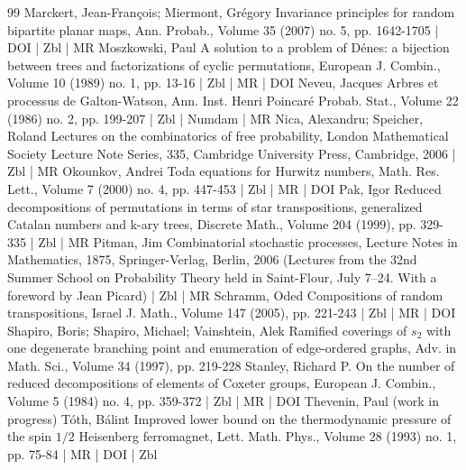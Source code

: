 \documentclass[10pt]{amsart}
\theoremstyle{definition}\newtheorem{defi}[theo]{Definition}\newtheorem{rema}[theo]{Remark}\newtheorem{exam}[theo]{Example}\newtheorem{exem}[theo]{Example}\newtheorem{nota}[theo]{Notation}
\begin{document}
\begin{thebibliography}{99}
Marckert, Jean-François; Miermont, Grégory Invariance principles for random bipartite planar maps, Ann. Probab., Volume 35 (2007) no. 5, pp. 1642-1705 | DOI | Zbl | MR
Moszkowski, Paul A solution to a problem of Dénes: a bijection between trees and factorizations of cyclic permutations, European J. Combin., Volume 10 (1989) no. 1, pp. 13-16 | Zbl | MR | DOI
Neveu, Jacques Arbres et processus de Galton-Watson, Ann. Inst. Henri Poincaré Probab. Stat., Volume 22 (1986) no. 2, pp. 199-207 | Zbl | Numdam | MR
Nica, Alexandru; Speicher, Roland Lectures on the combinatorics of free probability, London Mathematical Society Lecture Note Series, 335, Cambridge University Press, Cambridge, 2006 | Zbl | MR
Okounkov, Andrei Toda equations for Hurwitz numbers, Math. Res. Lett., Volume 7 (2000) no. 4, pp. 447-453 | Zbl | MR | DOI
Pak, Igor Reduced decompositions of permutations in terms of star transpositions, generalized Catalan numbers and k-ary trees, Discrete Math., Volume 204 (1999), pp. 329-335 | Zbl | MR
Pitman, Jim Combinatorial stochastic processes, Lecture Notes in Mathematics, 1875, Springer-Verlag, Berlin, 2006 (Lectures from the 32nd Summer School on Probability Theory held in Saint-Flour, July 7–24. With a foreword by Jean Picard) | Zbl | MR
Schramm, Oded Compositions of random transpositions, Israel J. Math., Volume 147 (2005), pp. 221-243 | Zbl | MR | DOI
Shapiro, Boris; Shapiro, Michael; Vainshtein, Alek Ramified coverings of $s_2$ with one degenerate branching point and enumeration of edge-ordered graphs, Adv. in Math. Sci., Volume 34 (1997), pp. 219-228
Stanley, Richard P. On the number of reduced decompositions of elements of Coxeter groups, European J. Combin., Volume 5 (1984) no. 4, pp. 359-372 | Zbl | MR | DOI
Thevenin, Paul (work in progress)
Tóth, Bálint Improved lower bound on the thermodynamic pressure of the spin $1/2$ Heisenberg ferromagnet, Lett. Math. Phys., Volume 28 (1993) no. 1, pp. 75-84 | MR | DOI | Zbl
\end{thebibliography}
\end{document}
